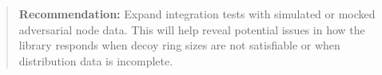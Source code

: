 \documentclass[12pt,a4paper]{article}
\begin{document}
\begin{quote}
    \textbf{Recommendation:}
Expand integration tests with simulated or mocked adversarial node data. This will help reveal potential issues in how the library responds when decoy ring sizes are not satisfiable or when distribution data is incomplete.
\end{quote}





    





\end{document}

